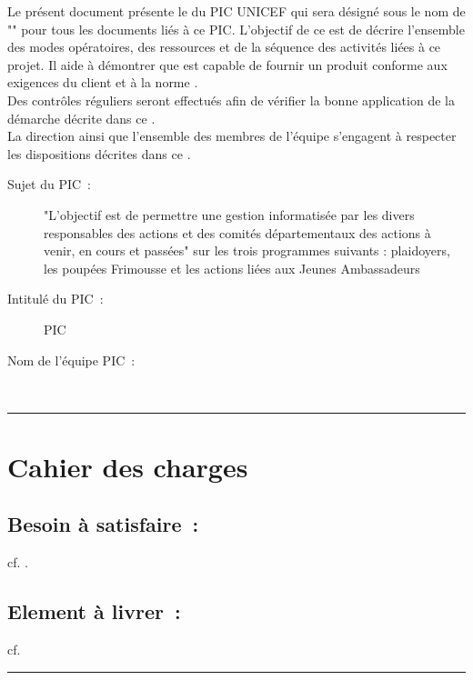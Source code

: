 		Le présent document présente le \PQ du PIC UNICEF qui sera désigné sous le nom de "\nomEquipe" pour tous les documents liés à ce PIC. L'objectif de ce \PQ est de décrire l'ensemble des modes opératoires, des ressources et de la séquence des activités liées à ce projet. Il aide à démontrer que \nomEquipe est capable de fournir un produit conforme aux exigences du client et à la norme \ISO . \\
		
		Des contrôles réguliers seront effectués afin de vérifier la bonne application de la démarche décrite dans ce \PQ .\\
		
		La direction ainsi que l'ensemble des membres de l'équipe \nomEquipe s'engagent à respecter les dispositions décrites dans ce \PQ .\\ 
		

		
	\begin{description}
		\item[Sujet du PIC~:] "L'objectif est de permettre une gestion informatisée par les divers responsables des actions et des comités départementaux des actions à venir, en cours et passées" sur les trois programmes suivants : plaidoyers, les poupées Frimousse et les actions liées aux Jeunes Ambassadeurs \\	
		\item[Intitulé du PIC~:] PIC \nomPIC \\	
		\item[Nom de l'équipe PIC~:] \nomEquipe \\
	\end{description}


\noindent\hfil\rule{\textwidth}{.4pt}\hfil


		
\section*{Cahier des charges}
		\subsection*{Besoin à satisfaire~:} 
			cf. \DSE . 		
		\subsection*{Element à livrer~:}
			cf. \DSE
			
					


	\vspace{1cm}
	\noindent\hfil\rule{\textwidth}{.4pt}\hfil
	\vspace{1cm}	
	
